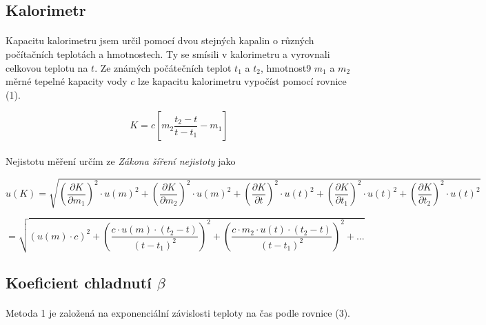 \documentclass[a4paper,11pt]{article}
\begin{document}
    \subsection{Kalorimetr}

        \paragraph{} Kapacitu kalorimetru jsem určil pomocí dvou stejných kapalin
        o různých počítačních teplotách a hmotnostech. Ty se smísili v kalorimetru
        a vyrovnali celkovou teplotu na $t$. Ze známých počátečních teplot $t_1$ a
        $t_2$, hmotnost9 $m_1$ a $m_2$ měrné tepelné kapacity vody $c$ lze 
        kapacitu kalorimetru vypočíst pomocí rovnice (1).

        \begin{equation}
            K = c \left[ m_2 \frac{t_2 - t}{t - t_1} - m_1 \right]
        \end{equation}


        \paragraph{} Nejistotu měření určím ze \textit{Zákona šíření nejistoty} jako

        $$
        u(K) = \sqrt{
          \left(\frac{\partial K}{\partial m_1}\right)^{2} \cdot u(m)^{2}
        + \left(\frac{\partial K}{\partial m_2}\right)^{2} \cdot u(m)^{2} 
        + \left(\frac{\partial K}{\partial t}\right)^{2} \cdot u(t)^{2}
        + \left(\frac{\partial K}{\partial t_1}\right)^{2} \cdot u(t)^{2}
        + \left(\frac{\partial K}{\partial t_2}\right)^{2} \cdot u(t)^{2}
        }
        $$

        \begin{equation}
        = \sqrt{
              \left(u(m) \cdot c\right)^{2}
            + \left(\frac{c \cdot u(m) \cdot (t_2 - t)}{(t - t_1)^{2}}\right)^{2}
            + \left(\frac{c \cdot m_2 \cdot u(t) \cdot (t_2 - t)}{\left(t - t_1\right)^{2}}\right)^{2}
            + ...
        }
        \end{equation}

    \subsection{Koeficient chladnutí $\beta$}

        \paragraph{} Metoda 1 je založená na exponenciální závislosti 
        teploty na čas podle rovnice (3).
\end{document}
